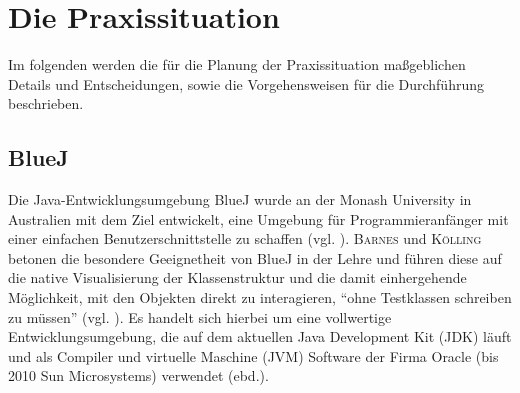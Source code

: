 \documentclass[paper=a4, DIV=13, BCOR=12mm, twoside=on, onecolumn=on, open = any, titlepage =on, parskip =half-, headsepline = on, footsepline = on, chapterprefix = on, sectionprefix = on, appendixprefix = off, fontsize = 12pt, numbers = noenddot, abstract = off]{scrreprt}
\begin{document}
\chapter{Die Praxissituation}
\onehalfspacing
\vspace*{-1cm}
 Im folgenden werden die für die Planung der Praxissituation maßgeblichen Details und Entscheidungen, sowie die Vorgehensweisen für die Durchführung beschrieben. 
\par \singlespacing
 \section{BlueJ}
\onehalfspacing
\label{sec:bluej}
Die Java-Entwicklungsumgebung BlueJ wurde an der Monash University in Australien mit dem Ziel entwickelt, eine Umgebung für Programmieranfänger mit einer einfachen Benutzerschnittstelle zu schaffen (vgl. \cite[S.14]{barnes:03}). \textsc{Barnes} und \textsc{Kölling} betonen die besondere Geeignetheit von BlueJ in der Lehre und führen diese auf die native Visualisierung der Klassenstruktur und die damit einhergehende Möglichkeit, mit den Objekten direkt zu interagieren, "`ohne Testklassen schreiben zu müssen"' (vgl. \cite[S.15]{barnes:03}). Es handelt sich hierbei um eine vollwertige Entwicklungsumgebung, die auf dem aktuellen Java Development Kit (JDK) läuft und als Compiler und virtuelle Maschine (JVM) Software der Firma Oracle (bis 2010 Sun Microsystems) verwendet (ebd.).


\end{document}
